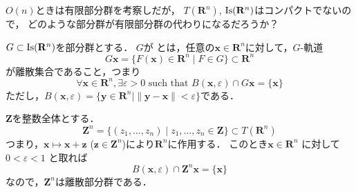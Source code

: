 \begin{Q}
   $O(n)$ときは有限部分群を考察しだが，
   $T(\mathbf R^n)$, $\operatorname{Is}(\mathbf R^n)$はコンパクトでないので，
   どのような部分群が有限部分群の代わりになるだろうか？
\end{Q}

$G\subset \operatorname{Is}(\mathbf R^n)$を部分群とする．
$G$が とは，任意の$\mathbf x\in \mathbf R^n$に対して，$G$-軌道
\[
	G\mathbf x
	=
	\{F(\mathbf x)\in \mathbf R^n\mid F\in G\}
	\subset \mathbf R^n
\]
が離散集合であること，つまり
\[
	\forall \mathbf x\in \mathbf R^n, 
	\exists \varepsilon>0 \text{ such that }
	B(\mathbf x, \varepsilon)\cap G\mathbf x
	=\{\mathbf x\}
\]
ただし，$
	B(\mathbf x, \varepsilon)
	=\{\mathbf y\in \mathbf R^n\mid
	 	\|\mathbf y-\mathbf x\|<\varepsilon
	 \}
$である．

\begin{ex} $\mathbf Z$を整数全体とする．
\[
	\mathbf Z^n
	=
	\{
		(z_1,\dots,z_n)\mid z_1,\dots, z_n \in \mathbf Z
	\}
	\subset T(\mathbf R^n)
\]
つまり，$\mathbf x\mapsto \mathbf x+ \mathbf z$ ($ \mathbf z \in \mathbf Z^n$)により$\mathbf R^n$に作用する．
このとき$\mathbf x\in \mathbf R^n$ に対して
$0<\varepsilon<1 $ と取れば
\[
	B(\mathbf x, \varepsilon)\cap \mathbf Z^n\mathbf x
	=\{\mathbf x\}
\]
なので，$\mathbf Z^n$は離散部分群である．
\end{ex}

%

%
%
%


